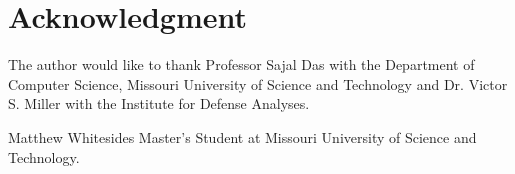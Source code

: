 \documentclass[journal,onecolumn]{IEEEtran}
\begin{document}
\section*{Acknowledgment}
The author would like to thank Professor Sajal Das with the Department of Computer Science, Missouri University of Science and Technology and Dr. Victor S. Miller with the Institute for Defense Analyses.

\ifCLASSOPTIONcaptionsoff
  \newpage
\fi




\begin{IEEEbiographynophoto}{Matthew Whitesides}
  Master's Student at Missouri University of Science and Technology.
\end{IEEEbiographynophoto}

\end{document}
